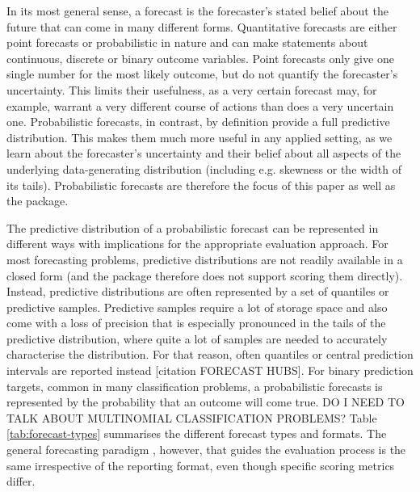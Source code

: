 \documentclass[article,shortnames]{jss}
\begin{document}
In its most general sense, a forecast is the forecaster’s stated belief about the future \citep{gneitingStrictlyProperScoring2007} that can come in many different forms. Quantitative forecasts are either point forecasts or probabilistic in nature and can make statements about continuous, discrete or binary outcome variables. Point forecasts only give one single number for the most likely outcome, but do not quantify the forecaster's uncertainty. This limits their usefulness, as a very certain forecast may, for example, warrant a very different course of actions than does a very uncertain one. Probabilistic forecasts, in contrast, by definition provide a full predictive distribution. This makes them much more useful in any applied setting, as we learn about the forecaster's uncertainty and their belief about all aspects of the underlying data-generating distribution (including e.g. skewness or the width of its tails). Probabilistic forecasts are therefore the focus of this paper as well as the  package. 

The predictive distribution of a probabilistic forecast can be represented in different ways with implications for the appropriate evaluation approach. For most forecasting problems, predictive distributions are not readily available in a closed form (and the  package therefore does not support scoring them directly). Instead, predictive distributions are often represented by a set of quantiles or predictive samples. Predictive samples require a lot of storage space and also come with a loss of precision that is especially pronounced in the tails of the predictive distribution, where quite a lot of samples are needed to accurately characterise the distribution. For that reason, often quantiles or central prediction intervals are reported instead [citation FORECAST HUBS]. For binary prediction targets, common in many classification problems, a probabilistic forecasts is represented by the probability that an outcome will come true. DO I NEED TO TALK ABOUT MULTINOMIAL CLASSIFICATION PROBLEMS? Table \ref{tab:forecast-types} summarises the different forecast types and formats. The general forecasting paradigm \cite{gneitingProbabilisticForecastsCalibration2007}, however, that guides the evaluation process is the same irrespective of the reporting format, even though specific scoring metrics differ. 
\end{document}
